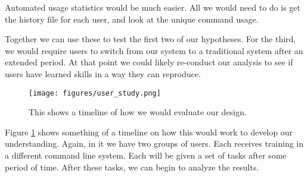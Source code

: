 Automated usage statistics would be much easier. All we would need to do is get
the history file for each user, and look at the unique command usage.

Together we can use these to test the first two of our hypotheses. For the
third, we would require users to switch from our system to a traditional system
after an extended period. At that point we could likely re-conduct our analysis
to see if users have learned skills in a way they can reproduce.
\begin{figure}[ht]
  \centering
  \texttt{[image: figures/user\_study.png]}
  \caption{\label{fig:ustud} This shows a timeline of how we would evaluate our
    design.}
\end{figure}
Figure \ref{fig:ustud} shows something of a timeline on how this would work to
develop our understanding. Again, in it we have two groups of users. Each
receives training in a different command line system. Each will be given a set
of tasks after some period of time. After these tasks, we can begin to analyze
the results.



